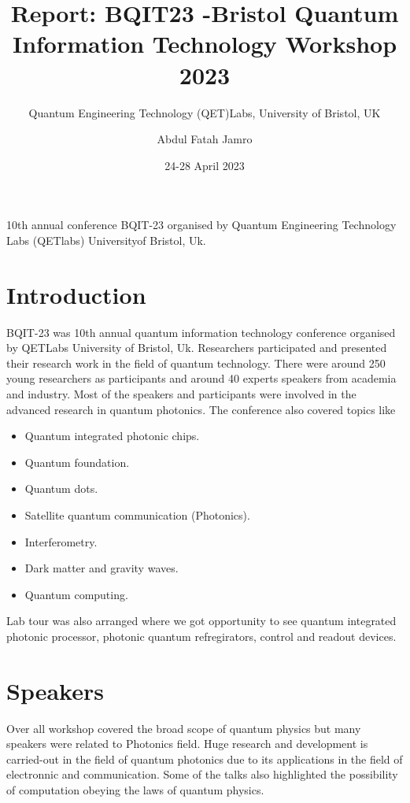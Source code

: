 \documentclass[a4paper, 12pt]{scrartcl}
\title{Report: BQIT23 -Bristol Quantum Information Technology Workshop 2023}
\subtitle{Quantum Engineering Technology (QET)Labs, University of Bristol, UK}
\author{Abdul Fatah Jamro}
\date{24-28 April 2023 }
\begin{document}
\maketitle
  10th annual conference BQIT-23 organised by Quantum Engineering Technology
  Labs (QETlabs) Universityof Bristol, Uk.

\section{Introduction}
  BQIT-23 was 10th annual quantum information technology conference organised 
  by QETLabs University of Bristol, Uk. Researchers participated and presented 
  their research work in the field of quantum technology. There were around 250
  young researchers as participants and around 40 experts speakers from academia and industry.
  Most of the speakers and participants were involved in the advanced research in quantum photonics. 
  The conference also covered topics like 

\begin{itemize}
  \item Quantum integrated photonic chips.
  \item Quantum foundation.
  \item Quantum dots.
  \item Satellite quantum communication (Photonics).
  \item Interferometry.
  \item Dark matter and gravity waves.
  \item Quantum computing.
\end{itemize}

Lab tour was also arranged where we got opportunity to see quantum integrated photonic processor,
photonic quantum refregirators, control and readout devices.

\section{Speakers}
  Over all workshop covered the broad scope of quantum physics but many speakers were related to Photonics field. Huge research and development is carried-out
  in the field of quantum photonics due to its applications in the field of electronnic and
  communication. Some of the talks also highlighted the possibility of computation obeying the laws of quantum physics.
\end{document}
